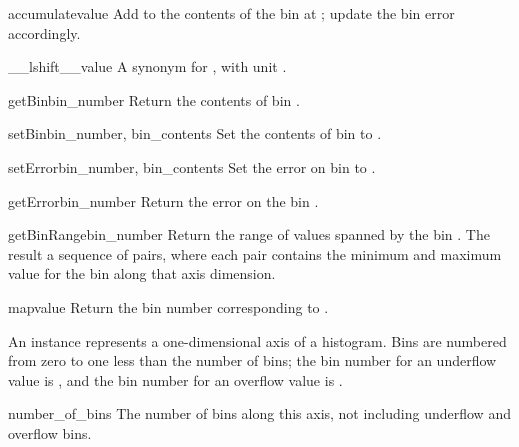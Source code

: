 \begin{methoddesc}{accumulate}{value}
 Add  to the contents of the bin at ; update the
 bin error accordingly.
\end{methoddesc}

\begin{methoddesc}{__lshift__}{value}
 A synonym for , with unit .
\end{methoddesc}

\begin{methoddesc}{getBin}{bin_number}
 Return the contents of bin .
\end{methoddesc}

\begin{methoddesc}{setBin}{bin_number, bin_contents}
 Set the contents of bin  to . 
\end{methoddesc}

\begin{methoddesc}{setError}{bin_number, bin_contents}
 Set the error on bin  to . 
\end{methoddesc}

\begin{methoddesc}{getError}{bin_number}
 Return the error on the bin .
\end{methoddesc}

\begin{methoddesc}{getBinRange}{bin_number}
 Return the range of values spanned by the bin .  The
 result a sequence of pairs, where each pair contains the minimum and
 maximum value for the bin along that axis dimension.
\end{methoddesc}

\begin{methoddesc}{map}{value}
 Return the bin number corresponding to .
\end{methoddesc}

An  instance represents a one-dimensional axis of a
histogram.  Bins are numbered from zero to one less than the number of
bins; the bin number for an underflow value is , and
the bin number for an overflow value is .

\begin{memberdesc}{number_of_bins}
 \readonly The number of bins along this axis, not including underflow
 and overflow bins.
\end{memberdesc}

